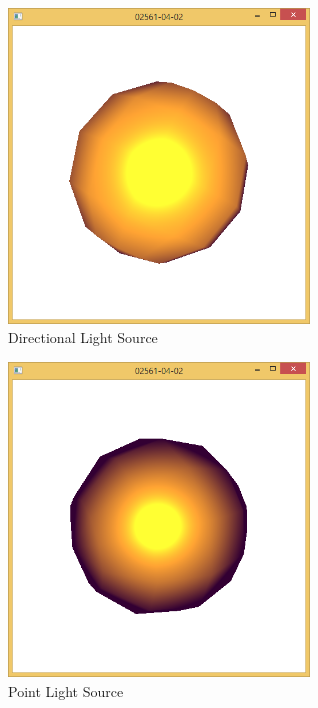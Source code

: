\begin{figure}[hp]
\centering
\includegraphics[width=8cm]{../Screenshots/ex-4/2-1.png}
\caption{Directional Light Source}
\label{fig:4-2-1}
\end{figure}

\begin{figure}[hp]
\centering
\includegraphics[width=8cm]{../Screenshots/ex-4/2-2.png}
\caption{Point Light Source}
\label{fig:4-2-2}
\end{figure}





